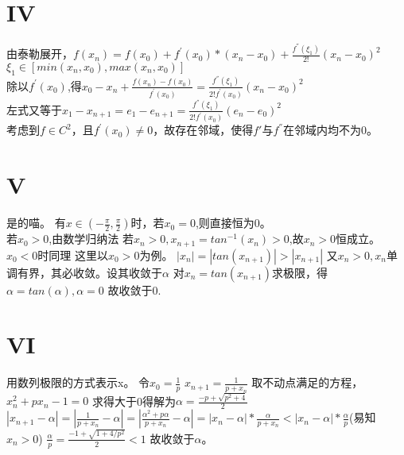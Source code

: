 \documentclass{article}
\begin{document}
\section*{IV}
\begin{flushleft}
  由泰勒展开，$f(x_n)=f(x_0)+f^{'}(x_0)*(x_n-x_0)+\frac{f^{''}(\xi_1)}{2!}(x_n-x_0)^2$  $\xi_1 \in [min(x_n,x_0),max(x_n,x_0)]$\\
  除以$f^{'}(x_0)$,得$x_0-x_n+\frac{f(x_n)-f(x_0)}{f^{'}(x_0)}=\frac{f^{''}(\xi_1)}{2!f^{'}(x_0)}(x_n-x_0)^2$\\
  左式又等于$x_1-x_{n+1}=e_1-e_{n+1}=\frac{f^{''}(\xi_1)}{2!f^{'}(x_0)}(e_n-e_0)^2$\\
  考虑到$f \in C^2$，且$f^{'}(x_0) \neq 0$，故存在邻域，使得$f'$与$f^{''}$在邻域内均不为0。\\
  


\end{flushleft}

\section*{V}
\begin{flushleft}
  是的喵。
  有$x \in (-\frac{\pi}{2},\frac{\pi}{2})$时，若$x_0=0$,则直接恒为0。\\
  若$x_0>0$,由数学归纳法 $若x_n>0,x_{n+1}=tan^{-1}(x_n)>0$,故$x_n>0$恒成立。$x_0<0$时同理
  这里以$x_0>0$为例。
  $|x_n|=|tan(x_{n+1})|>|x_{n+1}|$
  又$x_n>0,{x_n}$单调有界，其必收敛。设其收敛于$\alpha$
  对$x_n=tan(x_{n+1})$求极限，得$\alpha=tan(\alpha),\alpha=0$
  故收敛于0.
\end{flushleft}

\section*{VI}
\begin{flushleft}
  用数列极限的方式表示x。
  令$x_0=\frac{1}{p}$
  $x_{n+1}=\frac{1}{p+x_n}$
  取不动点满足的方程，$x_n^2+px_n-1=0$
  求得大于0得解为$\alpha=\frac{-p+\sqrt{p^2+4}}{2}$
  $|x_{n+1}-\alpha|=|\frac{1}{p+x_n}-\alpha|=|\frac{\alpha^2+p\alpha}{p+x_n}-\alpha|=|x_n-\alpha|*\frac{\alpha}{p+x_n}<|x_n-\alpha|*\frac{\alpha}{p}$(易知$x_n>0$)
  $\frac{\alpha}{p}=\frac{-1+\sqrt{1+4/p^2}}{2}<1$
  故收敛于$\alpha$。

\end{flushleft}
\end{document}
